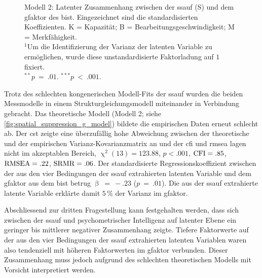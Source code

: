 \documentclass[11pt, twoside, a4paper]{book}		%
\begin{document}
\begin{figure}[htbp]
	
	\vspace{.2cm}
	\caption[Modell 2: Strukturgleichungsmodell zur Vorhersage des \gls{gfaktor}s durch die \gls{ssauf}]{Modell 2: Latenter Zusammenhang zwischen der \gls{ssauf} (\textsf{S}) und dem \gls{gfaktor} des \gls{bist}. Eingezeichnet sind die standardisierten Koeffizienten. \textsf{K} = Kapazität; \textsf{B} = Bearbeitungsgeschwindigkeit; \textsf{M} = Merkfähigkeit.\\
	$^1$Um die Identifizierung der Varianz der latenten Variable zu ermöglichen, wurde diese unstandardisierte Faktorladung auf $1$ fixiert.\\
	$^{**}p~=~.01$. $^{***}p~<~.001$.}
	\label{fig:spatial_suppression_g_model}
\end{figure} 

Trotz des schlechten kongenerischen Modell-Fits der \gls{ssauf} wurden die beiden Messmodelle in einem Strukturgleichungsmodell miteinander in Verbindung gebracht. Das theoretische Modell (Modell 2; siehe \autoref{fig:spatial_suppression_g_model}) bildete die empirischen Daten erneut schlecht ab.  Der \gls{cst} zeigte eine überzufällig hohe Abweichung zwischen der theoretische und der empirischen Var\-ianz-Ko\-var\-ianz\-ma\-trix an und der \gls{cfi} und \gls{rmsea} lagen nicht im akzeptablen Bereich, $\upchi^2(13)=123.88$, $p<.001$, $\textnormal{CFI}=.85$, $\textnormal{RMSEA}=.22$, $\textnormal{SRMR}=.06$. 
Der standardisierte Regressionskoeffizient zwischen der aus den vier Bedingungen der \gls{ssauf} extrahierten latenten Variable und dem \gls{gfaktor} aus dem \gls{bist} betrug $\upbeta~=~-.23$ ($p~=~.01$).
Die aus der \gls{ssauf} extrahierte latente Variable erklärte damit $5\,\%$ der Varianz im \gls{gfaktor}.

Abschliessend zur dritten Fragestellung kann festgehalten werden, dass sich zwischen der \gls{ssauf} und psychometrischer Intelligenz auf latenter Ebene ein geringer bis mittlerer negativer Zusammenhang zeigte.
Tiefere Faktorwerte auf der aus den vier Bedingungen der \gls{ssauf} extrahierten latenten Variablen waren also tendenziell mit höheren Faktorwerten im \gls{gfaktor} verbunden. Dieser Zusammenhang muss jedoch aufgrund des schlechten theoretischen Modells  mit Vorsicht interpretiert werden.
\end{document}
